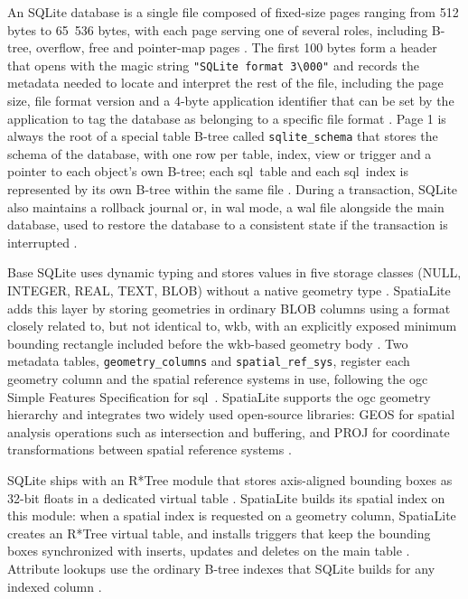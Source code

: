 An SQLite database is a single file composed of fixed-size pages ranging from 512 bytes to 65~536 bytes, with each page serving one of several roles, including B-tree, overflow, free and pointer-map pages \parencite{sqlite2024_fileformat}. The first 100 bytes form a header that opens with the magic string \texttt{"SQLite format 3\textbackslash 000"} and records the metadata needed to locate and interpret the rest of the file, including the page size, file format version and a 4-byte application identifier that can be set by the application to tag the database as belonging to a specific file format \parencite{sqlite2024_fileformat}. Page 1 is always the root of a special table B-tree called \texttt{sqlite\_schema} that stores the schema of the database, with one row per table, index, view or trigger and a pointer to each object's own B-tree; each \acrshort{sql} table and each \acrshort{sql} index is represented by its own B-tree within the same file \parencite{sqlite2024_fileformat}. During a transaction, SQLite also maintains a rollback journal or, in \acrfull{wal} mode, a \acrshort{wal} file alongside the main database, used to restore the database to a consistent state if the transaction is interrupted \parencite{sqlite2024_fileformat}.

Base SQLite uses dynamic typing and stores values in five storage classes (NULL, INTEGER, REAL, TEXT, BLOB) without a native geometry type \parencite{sqlite2024_datatype}. SpatiaLite adds this layer by storing geometries in ordinary BLOB columns using a format closely related to, but not identical to, \acrshort{wkb}, with an explicitly exposed minimum bounding rectangle included before the \acrshort{wkb}-based geometry body \parencite{gaia2011_blob_geometry}. Two metadata tables, \texttt{geometry\_columns} and \texttt{spatial\_ref\_sys}, register each geometry column and the spatial reference systems in use, following the \acrshort{ogc} Simple Features Specification for \acrshort{sql} \parencite{gaia2011_spatialite_manual}. SpatiaLite supports the \acrshort{ogc} geometry hierarchy and integrates two widely used open-source libraries: GEOS for spatial analysis operations such as intersection and buffering, and PROJ for coordinate transformations between spatial reference systems \parencite{gaia2011_spatialite_manual}.

SQLite ships with an R*Tree module that stores axis-aligned bounding boxes as 32-bit floats in a dedicated virtual table \parencite{sqlite2024_rtree_module}. SpatiaLite builds its spatial index on this module: when a spatial index is requested on a geometry column, SpatiaLite creates an R*Tree virtual table, and installs triggers that keep the bounding boxes synchronized with inserts, updates and deletes on the main table \parencite{gaia2011_rtree_cookbook}. Attribute lookups use the ordinary B-tree indexes that SQLite builds for any indexed column \parencite{sqlite2024_fileformat}.

